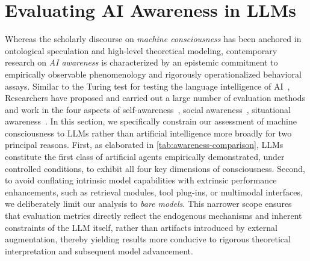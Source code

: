 \section{Evaluating AI Awareness in LLMs}
\label{sec:evaluation}



Whereas the scholarly discourse on \emph{machine consciousness} has been anchored in ontological speculation and high‑level theoretical modeling, contemporary research on \emph{AI awareness} is characterized by an epistemic commitment to empirically observable phenomenology and rigorously operationalized behavioral assays. Similar to the Turing test for testing the language intelligence of AI~\citep{turing1950mind, sejnowski2023large}, Researchers have proposed and carried out a large number of evaluation methods and work in the four aspects of self-awareness~\citep{lewis2011survey, yin2023large},  social awareness~\citep{cuzzolin2020knowing, strachan2024testing, bainbridge1994artificial, wang2023emotional}, situational awareness~\citep{laine2024me, meinke2024frontier}. In this section, we specifically constrain our assessment of machine consciousness to LLMs rather than artificial intelligence more broadly for two principal reasons. First, as elaborated in \autoref{tab:awareness-comparison}, LLMs constitute the first class of artificial agents empirically demonstrated, under controlled conditions, to exhibit all four key dimensions of consciousness. Second, to avoid conflating intrinsic model capabilities with extrinsic performance enhancements, such as retrieval modules, tool plug-ins, or multimodal interfaces, we deliberately limit our analysis to \textit{bare models}. This narrower scope ensures that evaluation metrics directly reflect the endogenous mechanisms and inherent constraints of the LLM itself, rather than artifacts introduced by external augmentation, thereby yielding results more conducive to rigorous theoretical interpretation and subsequent model advancement.

